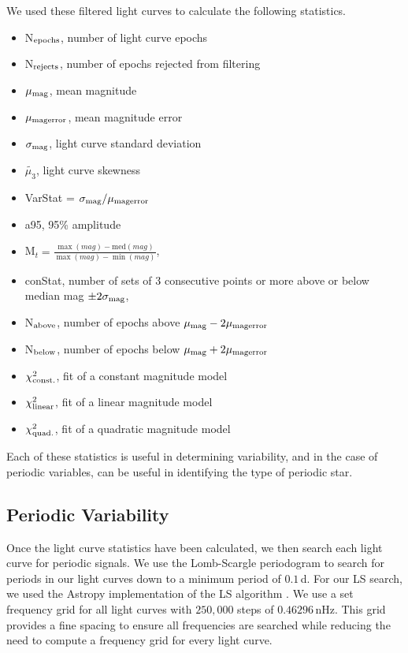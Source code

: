 \documentclass[twocolumn, tighten, astrosymb]{aastex631}
\begin{document}
We used these filtered light curves to calculate the following statistics.
\begin{singlespace}
\begin{itemize}[itemsep=1mm, parsep=0pt] %
    \item N$_{\rm{epochs}}$, number of light curve epochs
    \item N$_{\rm{rejects}}$, number of epochs rejected from filtering
    \item $\mu_{\rm{mag}}$, mean magnitude
    \item $\mu_{\rm{mag error}}$, mean magnitude error
    \item $\sigma_{\rm{mag}}$, light curve standard deviation
    \item $\tilde{\mu_3}$, light curve skewness
    \item VarStat = $\sigma_{\rm{mag}} / \mu_{\rm{mag error}}$
    \item a95, 95\% amplitude
    \item M$_t = \frac{\max{(mag)} - \textrm{med}(mag)}{\max{(mag)} - \min{(mag)}}$, \citep{Mt}
    \item conStat, number of sets of 3 consecutive points or more above or below median mag $\pm 2\sigma_{\rm{mag}}$, \citep{constat1, constat2}
    \item N$_{\rm{above}}$, number of epochs above $\mu_{\rm{mag}} - 2\mu_{\rm{mag error}}$
    \item N$_{\rm{below}}$, number of epochs below $\mu_{\rm{mag}} + 2\mu_{\rm{mag error}}$
    \item $\chi^2_{\rm{const.}}$, fit of a constant magnitude model
    \item $\chi^2_{\rm{linear}}$, fit of a linear magnitude model
    \item $\chi^2_{\rm{quad.}}$, fit of a quadratic magnitude model
\end{itemize}
\end{singlespace}

Each of these statistics is useful in determining variability, and in the case of periodic variables, can be useful in identifying the type of periodic star. 

\subsection{Periodic Variability} \label{subsec:periodic}

Once the light curve statistics have been calculated, we then search each light curve for periodic signals. We use the Lomb-Scargle periodogram \citep[LS;][]{Lomb1976, Scargle1982} to search for periods in our light curves down to a minimum period of $0.1$\,d. For our LS search, we used the Astropy \citep{astropy2} implementation of the LS algorithm \citep{astropyLS1, astropyLS2}. We use a set frequency grid for all light curves with $250,000$ steps of $0.46296$\,nHz. This grid provides a fine spacing to ensure all frequencies are searched while reducing the need to compute a frequency grid for every light curve.
\end{document}
